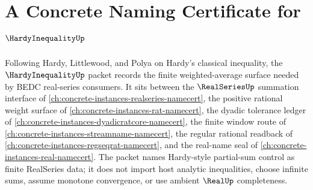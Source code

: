 \chapter{A Concrete Naming Certificate for $\HardyInequalityUp$}
\label{ch:concrete-instances-hardy-inequality-namecert}

Following Hardy, Littlewood, and Polya on Hardy's classical inequality, the $\HardyInequalityUp$ packet records the finite weighted-average surface needed by BEDC real-series consumers. It sits between the $\RealSeriesUp$ summation interface of \autoref{ch:concrete-instances-realseries-namecert}, the positive rational weight surface of \autoref{ch:concrete-instances-rat-namecert}, the dyadic tolerance ledger of \autoref{ch:concrete-instances-dyadicratcore-namecert}, the finite window route of \autoref{ch:concrete-instances-streamname-namecert}, the regular rational readback of \autoref{ch:concrete-instances-regseqrat-namecert}, and the real-name seal of \autoref{ch:concrete-instances-real-namecert}. The packet names Hardy-style partial-sum control as finite RealSeries data; it does not import host analytic inequalities, choose infinite sums, assume monotone convergence, or use ambient $\RealUp$ completeness.

